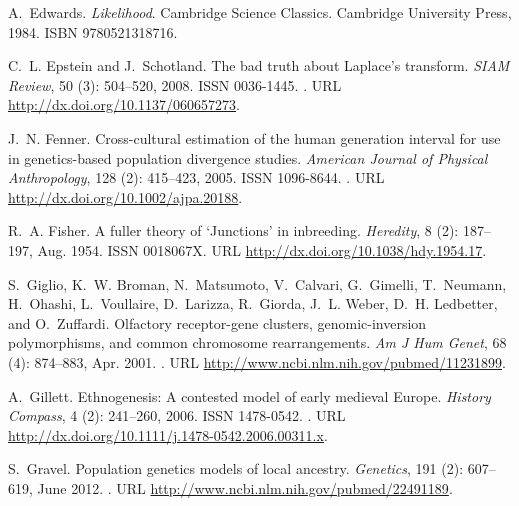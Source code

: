 \documentclass{article}
\begin{document}
\begin{thebibliography}{76}
A.~Edwards.
\newblock \emph{Likelihood}.
\newblock Cambridge Science Classics. Cambridge University Press, 1984.
\newblock ISBN 9780521318716.

C.~L. Epstein and J.~Schotland.
\newblock The bad truth about {L}aplace's transform.
\newblock \emph{SIAM Review}, 50 (3): 504--520, 2008.
\newblock ISSN 0036-1445.
\newblock {}.
\newblock URL \url{http://dx.doi.org/10.1137/060657273}.

J.~N. Fenner.
\newblock Cross-cultural estimation of the human generation interval for use in
  genetics-based population divergence studies.
\newblock \emph{American Journal of Physical Anthropology}, 128
  (2): 415--423, 2005.
\newblock ISSN 1096-8644.
\newblock {}.
\newblock URL \url{http://dx.doi.org/10.1002/ajpa.20188}.

R.~A. Fisher.
\newblock A fuller theory of `{Junctions}' in inbreeding.
\newblock \emph{Heredity}, 8 (2): 187--197, Aug. 1954.
\newblock ISSN 0018067X.
\newblock URL \url{http://dx.doi.org/10.1038/hdy.1954.17}.

S.~Giglio, K.~W. Broman, N.~Matsumoto, V.~Calvari, G.~Gimelli, T.~Neumann,
  H.~Ohashi, L.~Voullaire, D.~Larizza, R.~Giorda, J.~L. Weber, D.~H. Ledbetter,
  and O.~Zuffardi.
\newblock Olfactory receptor-gene clusters, genomic-inversion polymorphisms,
  and common chromosome rearrangements.
\newblock \emph{Am J Hum Genet}, 68 (4): 874--883, Apr. 2001.
\newblock {}.
\newblock URL \url{http://www.ncbi.nlm.nih.gov/pubmed/11231899}.

A.~Gillett.
\newblock Ethnogenesis: {A} contested model of early medieval {Europe}.
\newblock \emph{History Compass}, 4 (2): 241--260, 2006.
\newblock ISSN 1478-0542.
\newblock {}.
\newblock URL \url{http://dx.doi.org/10.1111/j.1478-0542.2006.00311.x}.

S.~Gravel.
\newblock Population genetics models of local ancestry.
\newblock \emph{Genetics}, 191 (2): 607--619, June 2012.
\newblock {}.
\newblock URL \url{http://www.ncbi.nlm.nih.gov/pubmed/22491189}.


\end{thebibliography}
\end{document}
